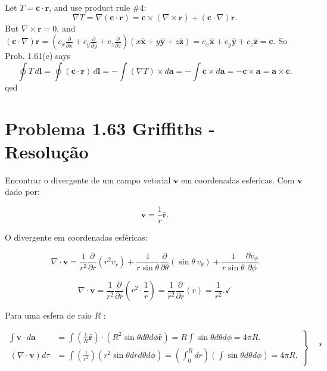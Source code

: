 \documentclass[a4paper,12pt]{article}
\begin{document}
\begin{itemize}
    Let $T = \mathbf{c} \cdot \mathbf{r}$, and use product rule \#4: 
    \[
    \nabla T = \nabla (\mathbf{c} \cdot \mathbf{r}) = \mathbf{c} \times (\nabla \times \mathbf{r}) + (\mathbf{c} \cdot \nabla)\mathbf{r}.
    \] 
    But $\nabla \times \mathbf{r} = 0$, and $(\mathbf{c} \cdot \nabla)\mathbf{r} = (c_x \frac{\partial}{\partial x} + c_y \frac{\partial}{\partial y} + c_z \frac{\partial}{\partial z})(x \hat{\mathbf{x}} + y \hat{\mathbf{y}} + z \hat{\mathbf{z}}) = c_x \hat{\mathbf{x}} + c_y \hat{\mathbf{y}} + c_z \hat{\mathbf{z}} = \mathbf{c}.$  
    So Prob. 1.61(e) says  
    \[
    \oint T \, d\mathbf{l} = \oint (\mathbf{c} \cdot \mathbf{r}) \, d\mathbf{l} = -\int (\nabla T) \times d\mathbf{a} = -\int \mathbf{c} \times d\mathbf{a} = -\mathbf{c} \times \mathbf{a} = \mathbf{a} \times \mathbf{c}.
    \]
    \hspace{1cm} qed
\end{itemize}


\section*{Problema 1.63 Griffiths - Resolu\c{c}\~ao}

Encontrar o divergente de um campo vetorial $\mathbf{v}$ em coordenadas esfericas. Com $\mathbf{v}$ dado por:

\begin{equation}
\mathbf{v} = \frac{1}{r} \hat{\mathbf{r}}.
\end{equation}

O divergente em coordenadas esféricas:

\begin{equation}
\nabla \cdot \mathbf{v} = 
\frac{1}{r^2}\frac{\partial}{\partial r}\left(r^2 v_r\right) 
+ \frac{1}{r \sin\theta}\frac{\partial}{\partial \theta}\left(\sin\theta \, v_\theta\right)
+ \frac{1}{r \sin\theta}\frac{\partial v_\phi}{\partial \phi}
\end{equation}


\begin{equation}
    \nabla \cdot \mathbf{v}=\frac{1}{r^{2}} \frac{\partial}{\partial r}\left(r^{2} \cdot \frac{1}{r}\right)=\frac{1}{r^{2}} \frac{\partial}{\partial r}(r)=\frac{1}{r^{2}} . \checkmark
\end{equation}
    
Para uma esfera de raio $R$ :

\begin{equation}
\left.\begin{array}{rl}
\int \mathbf{v} \cdot d \mathbf{a} & =\int\left(\frac{1}{R} \hat{\mathbf{r}}\right) \cdot\left(R^{2} \sin \theta d \theta d \phi \hat{\mathbf{r}}\right)=R \int \sin \theta d \theta d \phi=4 \pi R . \\\
(\nabla \cdot \mathbf{v}) d \tau & =\int\left(\frac{1}{r^{2}}\right)\left(r^{2} \sin \theta d r d \theta d \phi\right)=\left(\int_{0}^{R} d r\right)\left(\int \sin \theta d \theta d \phi\right)=4 \pi R .
\end{array}\right\} \begin{aligned}
& {*}\\
& 
\end{aligned}
\end{equation}
\end{document}
